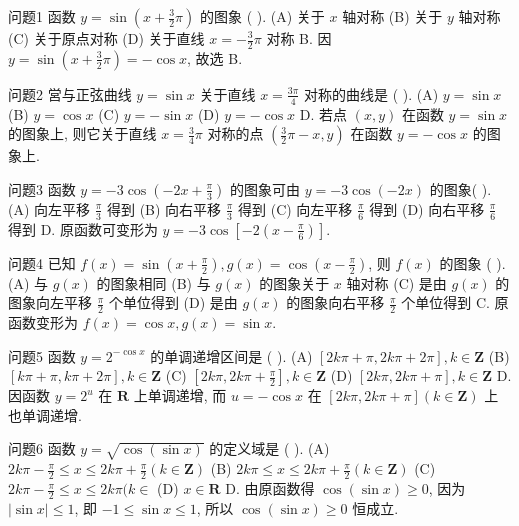 
问题1 函数 $y=\sin \left(x+\frac{3}{2} \pi\right)$ 的图象 ( ).
(A) 关于 $x$ 轴对称
(B) 关于 $y$ 轴对称
(C) 关于原点对称
(D) 关于直线 $x=-\frac{3}{2} \pi$ 对称
B. 因 $y=\sin \left(x+\frac{3}{2} \pi\right)=-\cos x$, 故选 B.



问题2 営与正弦曲线 $y=\sin x$ 关于直线 $x=\frac{3 \pi}{4}$ 对称的曲线是 ( ).
(A) $y=\sin x$
(B) $y=\cos x$
(C) $y=-\sin x$
(D) $y=-\cos x$
D. 若点 $(x, y)$ 在函数 $y=\sin x$ 的图象上, 则它关于直线 $x=\frac{3}{4} \pi$ 对称的点 $\left(\frac{3}{2} \pi-x, y\right)$ 在函数 $y=-\cos x$ 的图象上.



问题3 函数 $y=-3 \cos \left(-2 x+\frac{\pi}{3}\right)$ 的图象可由 $y=-3 \cos (-2 x)$ 的图象( ).
(A) 向左平移 $\frac{\pi}{3}$ 得到
(B) 向右平移 $\frac{\pi}{3}$ 得到
(C) 向左平移 $\frac{\pi}{6}$ 得到
(D) 向右平移 $\frac{\pi}{6}$ 得到
D. 原函数可变形为 $y=-3 \cos \left[-2\left(x-\frac{\pi}{6}\right)\right]$.



问题4 已知 $f(x)=\sin \left(x+\frac{\pi}{2}\right), g(x)=\cos \left(x-\frac{\pi}{2}\right)$, 则 $f(x)$ 的图象 ( ).
(A) 与 $g(x)$ 的图象相同
(B) 与 $g(x)$ 的图象关于 $x$ 轴对称
(C) 是由 $g(x)$ 的图象向左平移 $\frac{\pi}{2}$ 个单位得到
(D) 是由 $g(x)$ 的图象向右平移 $\frac{\pi}{2}$ 个单位得到
C. 原函数变形为 $f(x)=\cos x, g(x)=\sin x$.



问题5 函数 $y=2^{-\cos x}$ 的单调递增区间是 ( ).
(A) $[2 k \pi+\pi, 2 k \pi+2 \pi], k \in \mathbf{Z}$
(B) $[k \pi+\pi, k \pi+2 \pi], k \in \mathbf{Z}$
(C) $\left[2 k \pi, 2 k \pi+\frac{\pi}{2}\right], k \in \mathbf{Z}$
(D) $[2 k \pi, 2 k \pi+\pi], k \in \mathbf{Z}$
D. 因函数 $y=2^u$ 在 $\mathbf{R}$ 上单调递增, 而 $u=-\cos x$ 在 $[2 k \pi, 2 k \pi+\pi] (k \in \mathbf{Z})$ 上也单调递增.



问题6 函数 $y=\sqrt{\cos (\sin x)}$ 的定义域是 ( ).
(A) $2 k \pi-\frac{\pi}{2} \leqslant x \leqslant 2 k \pi+\frac{\pi}{2}(k \in \mathbf{Z})$
(B) $2 k \pi \leqslant x \leqslant 2 k \pi+\frac{\pi}{2}(k \in \mathbf{Z})$
(C) $2 k \pi-\frac{\pi}{2} \leqslant x \leqslant 2 k \pi(k \in$
(D) $x \in \mathbf{R}$
D. 由原函数得 $\cos (\sin x) \geqslant 0$, 因为 $|\sin x| \leqslant 1$, 即 $-1 \leqslant \sin x \leqslant 1$, 所以 $\cos (\sin x) \geqslant 0$ 恒成立.



